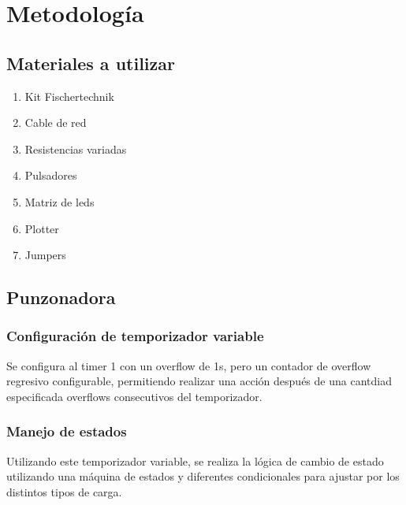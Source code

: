 \section{Metodología}

\subsection{Materiales a utilizar}
\begin{enumerate}
    \item Kit Fischertechnik
    \item Cable de red
    \item Resistencias variadas
    \item Pulsadores
    \item Matriz de leds
    \item Plotter 
    \item Jumpers
\end{enumerate}


\subsection{Punzonadora}
\subsubsection{Configuración de temporizador variable}
Se configura al timer 1 con un overflow de 1s, pero un contador de overflow regresivo configurable, permitiendo realizar una acción después de una cantdiad especificada overflows consecutivos del temporizador. 

\subsubsection{Manejo de estados}
Utilizando este temporizador variable, se realiza la lógica de cambio de estado utilizando una máquina de estados y diferentes condicionales para ajustar por los distintos tipos de carga. 

